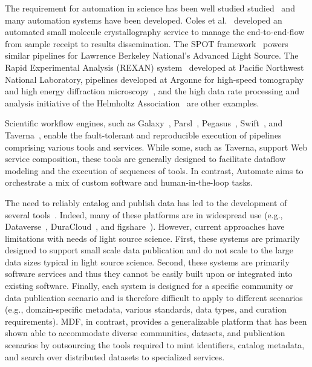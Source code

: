 \documentclass{aip-cp}
\newcommand\ryan[1]{}
\newcommand\ryan[1]{{\color{green}[Ryan: #1]}}
\begin{document}

The requirement for automation in science has been well studied
studied~\cite{king2009automation, deslippe2014workflow, chard17ripple} and 
many automation systems have been developed. Coles et 
al.~\cite{coles2005ecses,coles2006science} developed an automated small molecule crystallography 
service to manage the end-to-end-flow from sample receipt to results dissemination. 
The SPOT framework~\cite{deslippe2014workflow} powers similar pipelines for Lawrence Berkeley National's Advanced 
Light Source. 
The Rapid Experimental Analysis (REXAN) system~\cite{thomas2015towards} developed at Pacific Northwest National
Laboratory, pipelines developed at Argonne for high-speed tomography~\cite{Bicer_Europar15,bicer2017real} and high energy diffraction microscopy~\cite{park2015high},
and the high data rate processing and analysis initiative of the Helmholtz Association~\cite{gehrke2015high} are other 
examples.

Scientific workflow engines, such as Galaxy~\cite{galaxy}, Parsl~\cite{parsl}, 
Pegasus~\cite{pegasus}, Swift~\cite{wilde2011swift}, and Taverna~\cite{taverna},
enable the fault-tolerant and reproducible execution of pipelines comprising various tools and 
services. While some, such as Taverna, support Web service composition, these tools are generally 
designed to facilitate dataflow modeling and the execution of sequences of tools. In 
contrast, Automate aims to orchestrate a mix of custom software and human-in-the-loop 
tasks.

The need to reliably catalog and publish data has led to the development of several 
tools~\cite{chard2015publication,wilkinson16,costello09pub}. Indeed, many of these platforms are 
in widespread use (e.g., Dataverse~\cite{dataverse}, DuraCloud~\cite{duracloud}, and 
figshare~\cite{figshare}).
However, current approaches have limitations with  needs
of light source science. First, these systems are primarily designed to support small
scale data publication and do not scale to the large data sizes
typical in light source science. Second, these systems are primarily software services
and thus they cannot be easily built upon or integrated into existing software. Finally, 
each system is designed for a specific community or data publication scenario and is
therefore difficult to apply to different 
scenarios (e.g., domain-specific metadata, various standards, data types, and 
curation requirements).  
MDF, in contrast, provides a generalizable platform that has been shown able to accommodate diverse communities, datasets, 
and publication scenarios by outsourcing the tools required to mint identifiers, catalog metadata, 
and search over distributed datasets to specialized services.
\end{document}
